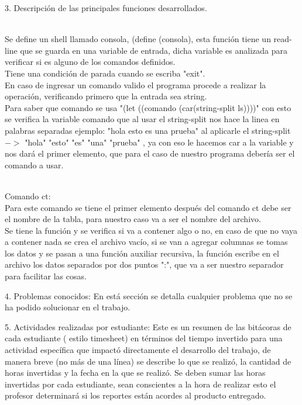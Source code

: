 \documentclass[12pt,a4paper]{report}
\begin{document}
\begin{flushleft}
3. Descripción de las principales funciones desarrollados.\\\

Se define un shell llamado consola, (define (consola), esta función tiene un read-line que se guarda en una variable de entrada, dicha variable es analizada
para verificar si es alguno de los comandos definidos.\\
Tiene una condición de parada cuando se escriba "exit".\\
En caso de ingresar un comando valido el programa procede a realizar la operación, verificando primero que la entrada sea string.\\
Para saber que comando se usa "(let ((comando (car(string-split ls))))" con esto se verifica la variable comando que al usar el string-split nos hace la linea
en palabras separadas ejemplo: "hola esto es una prueba"  al aplicarle el string-split $->$ "hola" "esto" "es" "una" "prueba" , ya con eso le hacemos car a 
la variable y nos dará el primer elemento, que para el caso de nuestro programa debería ser el comando a usar.\\\

Comando ct:\\
Para este comando se tiene el primer elemento después del comando ct debe ser el nombre de la tabla, para nuestro caso va a ser el nombre del archivo.\\
Se tiene la función y se verifica si va a contener algo o no, en caso de que no vaya a contener nada se crea el archivo vacío, si se van a agregar columnas
se tomas los datos y se pasan a una función auxiliar recursiva, la función escribe en el archivo los datos separados por dos puntos ":", que va a ser nuestro
separador para facilitar las cosas. 



\end{flushleft}

\begin{flushleft}

4. Problemas conocidos: En está sección se detalla cualquier problema que no se ha podido solucionar en el trabajo.

\end{flushleft}

\begin{flushleft}
5. Actividades realizadas por estudiante: Este es un resumen de las bitácoras
de cada estudiante ( estilo timesheet) en términos del tiempo invertido para
una actividad específica que impactó directamente el desarrollo del trabajo,
de manera breve (no más de una línea) se describe lo que se realizó, la
cantidad de horas invertidas y la fecha en la que se realizó. Se deben sumar
las horas invertidas por cada estudiante, sean conscientes a la hora de
realizar esto el profesor determinará si los reportes están acordes al
producto entregado.

\end{flushleft}
\end{document}
